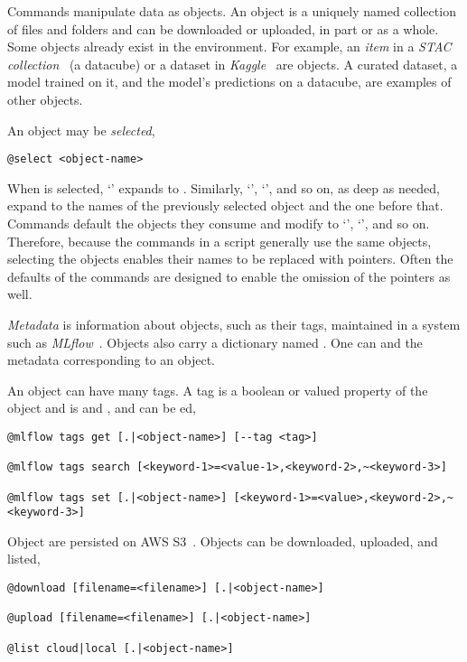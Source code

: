 Commands manipulate data as objects. An object is a uniquely named collection of files and folders and can be downloaded or uploaded, in part or as a whole. Some objects already exist in the environment. For example, an \emph{item} in a \emph{STAC collection}~\cite{stac_intro_tutorial} (a datacube) or a dataset in \emph{Kaggle}~\cite{chen2019-AIRD-dataset} are objects. A curated dataset, a model trained on it, and the model's predictions on a datacube, are examples of other objects.

An object may be \emph{selected},
%
\begin{verbatim}
@select <object-name>
\end{verbatim}
%
When  is selected,  `' expands to . Similarly, `', `', and so on, as deep as needed, expand to the names of the previously selected object and the one before that. Commands default the objects they consume and modify to `', `', and so on. Therefore, because the commands in a script generally use the same objects, selecting the objects enables their names to be replaced with pointers. Often the defaults of the commands are designed to enable the omission of the pointers as well.

\emph{Metadata} is information about objects, such as their tags, maintained in a system such as \emph{MLflow}~\cite{mlflow}. Objects also carry a dictionary named . One can  and  the metadata corresponding to an object.

An object can have many tags. A tag is a boolean or valued property of the object and is  and , and can be ed,
%
\begin{verbatim}
@mlflow tags get [.|<object-name>] [--tag <tag>]

@mlflow tags search [<keyword-1>=<value-1>,<keyword-2>,~<keyword-3>]

@mlflow tags set [.|<object-name>] [<keyword-1>=<value>,<keyword-2>,~<keyword-3>]
\end{verbatim}

Object are persisted on AWS S3~\cite{aws_s3}. Objects can be downloaded, uploaded, and listed,
%
\begin{verbatim}
@download [filename=<filename>] [.|<object-name>]

@upload [filename=<filename>] [.|<object-name>]
    
@list cloud|local [.|<object-name>]
\end{verbatim}